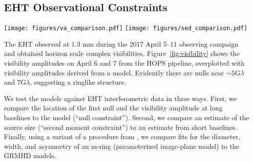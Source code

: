 \subsection{EHT Observational Constraints}


\begin{figure*}
  \centering
  \texttt{[image: figures/va\_comparison.pdf]}%
  \texttt{[image: figures/sed\_comparison.pdf]}\\
  \caption{(\emph{left}) Measured correlated flux densities of \sgra
    on April 7, 2017, from the HOPS pipeline, overplotted with a fiducial
    GRMHD+GRRT model.
    Details on the data can be found in paper~II, section~5.
    A description of the fiducial model is in section~\ref{sec:models}.
    (\emph{right}) }
  \label{fig:visibility}
\end{figure*}

The EHT observed \sgra at 1.3 mm during the 2017 April 5--11 observing campaign and obtained horizon scale complex visibilities.  Figure~\ref{fig:visibility} shows the visibility amplitudes on April 6 and 7 from  the HOPS pipeline, overplotted with visibility amplitudes derived from a model.  Evidently there are nulls near $\sim 5\mathrm{G}\lambda$ and $7\mathrm{G}\lambda$, suggesting a ringlike structure.

We test the models against EHT interferometric data in three ways.  First, we compare the location of the first null and the visibility amplitude at long baselines to the model (``null constraint'').  Second, we compare an estimate of the source size (``second moment constraint'') to an estimate from short baselines.  Finally, using a variant of a procedure from , we compare fits for the diameter, width, and asymmetry of an m-ring (parameterized image-plane model) to the GRMHD models.

